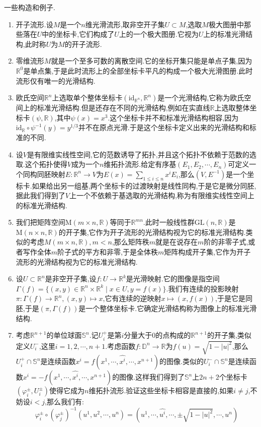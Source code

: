 一些构造和例子.
\begin{enumerate}
	\item 开子流形.设$M$是一个$n$维光滑流形,取非空开子集$U\subset M$,选取$M$极大图册中那些落在$U$中的坐标卡,它们构成了$U$上的一个极大图册.它视为$U$上的标准光滑结构,此时称$U$为$M$的开子流形.
	\item 零维流形$M$就是一个至多可数的离散空间.它的坐标开集只能是单点子集,因为$\mathbb{R}^0$是单点集,于是此时流形上的全部坐标卡平凡的构成一个极大光滑图册.此时流形仅有唯一的光滑结构.
	\item 欧氏空间$\mathbb{R}^n$上选取单个整体坐标卡$(\mathrm{id}_{\mathbb{R}^n},\mathbb{R}^n)$是一个光滑结构,它称为欧氏空间上的标准光滑结构.但是还存在不同的光滑结构,例如在实直线$\mathbb{R}$上选取整体坐标卡$(\psi,\mathbb{R})$,其中$\psi(x)=x^3$.这个坐标卡并不和标准光滑结构相容,因为$\mathrm{id}_{\mathbb{R}}\circ\psi^{-1}(y)=y^{1/3}$并不在原点光滑.于是这个坐标卡定义出来的光滑结构和标准的不同.
	\item 设$V$是有限维实线性空间,它的范数诱导了拓扑,并且这个拓扑不依赖于范数的选取.这个拓扑使得$V$成为一个$n$维拓扑流形.给定有序基$(E_1,E_2,\cdots,E_n)$可定义一个同构同胚映射$E:\mathbb{R}^n\to V$为$E(x)=\sum_{1\le i\le n}x^iE_i$,那么$(V,E^{-1})$是一个坐标卡.如果给出另一组基,两个坐标卡的过渡映射是线性同构,于是它是微分同胚,据此我们得到了$V$上一个不依赖于基选取的光滑结构,称为有限维实线性空间上的标准光滑结构.
	\item 我们把矩阵空间$\mathrm{M}(m\times n,\mathbb{R})$等同于$\mathbb{R}^{mn}$.此时一般线性群$\mathrm{GL}(n,\mathbb{R})$是$\mathrm{M}(n\times n,\mathbb{R})$的开子集,它作为开子流形的光滑结构视为它的标准光滑结构.类似的考虑$M(m\times n,\mathbb{R}),m<n$,那么矩阵秩$m$就是在说存在$m$阶的非零子式,或者写作全体$m$阶子式的平方和非零,于是全体秩$m$矩阵构成开子集,它作为开子流形的光滑结构视为它的标准光滑结构.
	\item 设$U\subset\mathbb{R}^n$是非空开子集,设$f:U\to\mathbb{R}^k$是光滑映射.它的图像是指空间$\Gamma(f)=\{(x,y)\in\mathbb{R}^n\times\mathbb{R}^k\mid x\in U,y=f(x)\}$.我们有连续的投影映射$\pi:\Gamma(f)\to\mathbb{R}^n,(x,y)\mapsto x$,它有连续的逆映射$x\mapsto(x,f(x))$,于是它是同胚,于是$(\pi,\Gamma(f))$是一个整体坐标卡.它确定光滑结构称为图像上的标准光滑结构.
	\item 考虑$\mathbb{R}^{n+1}$的单位球面$\mathbb{S}^n$.记$U_i^+$是第$i$分量大于0的点构成的$\mathbb{R}^{n+1}$的开子集,类似定义$U_i^-$,这里$i=1,2,\cdots,n+1$.考虑函数$f:\mathbb{D}^n\to\mathbb{R}$为$f(u)=\sqrt{1-|u|^2}$,那么$U_i^+\cap\mathbb{S}^n$是连续函数$x^i=f(x^1,\cdots,\hat{x^i},\cdots,x^{n+1})$的图像.类似的$U_i^-\cap\mathbb{S}^n$是连续函数$x^i=-f(x^1,\cdots,\hat{x^i},\cdots,x^{n+1})$的图像.这样我们得到了$\mathbb{S}^n$上$2n+2$个坐标卡$(\varphi_i^{\pm},U_i^{\pm})$使得它成为$n$维拓扑流形.验证这些坐标卡相容是直接的,如果$i\not=j$,不妨设$i<j$,那么我们有:
	$$\varphi_i^{\pm}\circ(\varphi_j^{\pm})^{-1}(u^1,u^2,\cdots,u^n)=\left(u^1,\cdots,\hat{u^i},\cdots,\pm\sqrt{1-|u|^2},\cdots,u^n\right)$$
	

\end{enumerate}
